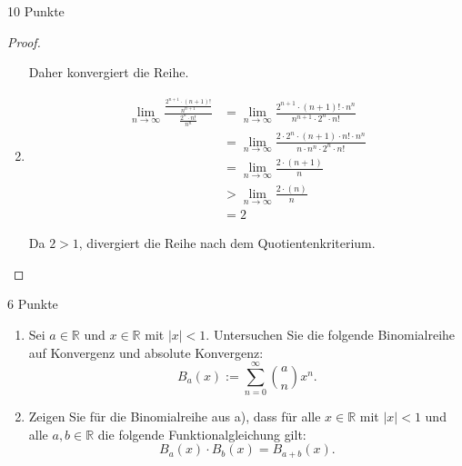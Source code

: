 \documentclass{problemset}
\begin{document}
\begin{problem}{10 Punkte}
\begin{proof}
\begin{enumerate}
              Daher konvergiert die Reihe.

        \item
              \begin{align*}
                  \lim_{n \to \infty} \frac{{\frac{2^{n+1} \cdot (n+1)!}{n^{n+1}}}}{\frac{2^n \cdot n!}{n^n}} & = \lim_{n \to \infty} \frac{2^{n+1} \cdot (n+1)! \cdot n^n}{n^{n+1} \cdot 2^n \cdot n!}                \\
                                                                                                              & = \lim_{n \to \infty} \frac{2 \cdot 2^n \cdot (n+1)\cdot n! \cdot n^n}{n \cdot n^n \cdot 2^n \cdot n!} \\
                                                                                                              & = \lim_{n \to \infty} \frac{2 \cdot (n+1)}{n}                                                          \\
                                                                                                              & > \lim_{n \to \infty} \frac{2 \cdot (n)}{n}                                                            \\
                                                                                                              & = 2
              \end{align*}

              Da $2 > 1$, divergiert die Reihe nach dem Quotientenkriterium.
    \end{enumerate}
\end{proof}
\end{problem}

\begin{problem}[Binomialreihe]{6 Punkte}
\begin{enumerate}
    \item Sei $a \in \mathbb{R}$ und $x \in \mathbb{R}$ mit $|x| < 1$.
          Untersuchen Sie die folgende Binomialreihe auf Konvergenz und
          absolute Konvergenz:
          \[
              B_a(x) := \sum_{n=0}^{\infty} \binom{a}{n}x^n.
          \]
    \item Zeigen Sie für die Binomialreihe aus a), dass für alle $x \in
          \mathbb{R}$ mit $|x| < 1$ und alle $a, b \in \mathbb{R}$ die folgende
          Funktionalgleichung gilt:
          \[
              B_a(x) \cdot B_b(x) = B_{a+b}(x).
          \]
\end{enumerate}
\end{problem}
\end{document}
